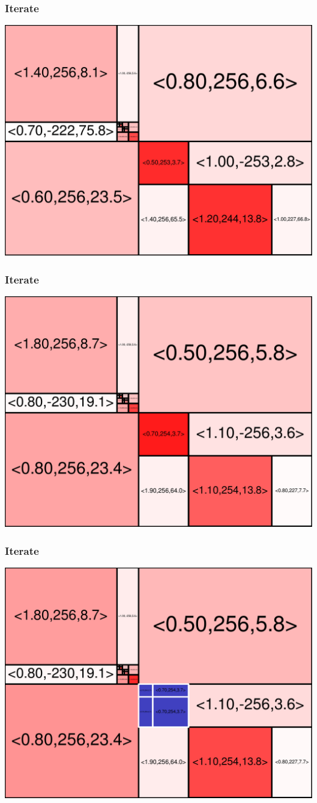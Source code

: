 \begin{frame}
\frametitle{Iterate}\begin{centering}\includegraphics[width=8.5 cm]{remy-graph/graph/test24.pdf}

\end{centering}\end{frame}


\begin{frame}
\frametitle{Iterate}\begin{centering}\includegraphics[width=8.5 cm]{remy-graph/graph/test25.pdf}

\end{centering}\end{frame}


\begin{frame}
\frametitle{Iterate}\begin{centering}\includegraphics[width=8.5 cm]{remy-graph/graph/test26.pdf}

\end{centering}\end{frame}


